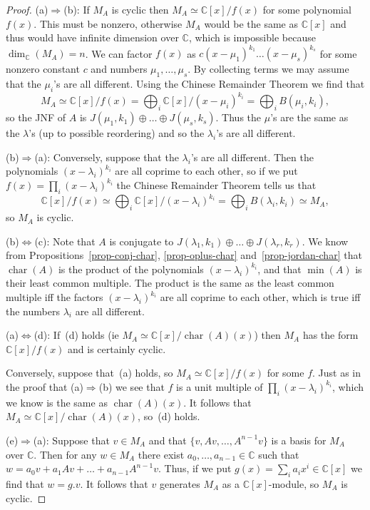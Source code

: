 \documentclass{amsart}
\newcommand{\chr}       {\operatorname{char}}
\newcommand{\C}         {{\mathbb{C}}}
\newcommand{\lm}        {\lambda}
\newcommand{\op}        {\oplus}
\newcommand{\iffa}      {\Leftrightarrow}
\renewcommand{\:}{\colon}
\theoremstyle{definition}
\begin{document}
\begin{proof}
 (a)$\Rightarrow$(b):
  If $M_A$ is cyclic then $M_A\simeq\C[x]/f(x)$ for some polynomial
  $f(x)$.  This must be nonzero, otherwise $M_A$ would be the same as
  $\C[x]$ and thus would have infinite dimension over $\C$, which is
  impossible because $\dim_\C(M_A)=n$.  We can factor $f(x)$ as
  $c(x-\mu_1)^{k_1}\ldots(x-\mu_s)^{k_s}$ for some nonzero constant
  $c$ and numbers $\mu_1,\ldots,\mu_s$.  By collecting terms we may
  assume that the $\mu_i$'s are all different.  Using the Chinese
  Remainder Theorem we find that 
  \[ M_A\simeq\C[x]/f(x)=\bigoplus_i\C[x]/(x-\mu_i)^{k_i}=
     \bigoplus_iB(\mu_i,k_i),
  \]
  so the JNF of $A$ is $J(\mu_1,k_1)\op\ldots\op J(\mu_s,k_s)$.  Thus
  the $\mu$'s are the same as the $\lm$'s (up to possible reordering)
  and so the $\lm_i$'s are all different.
 
 (b)$\Rightarrow$(a): Conversely, suppose that the $\lm_i$'s are all
  different.  Then the polynomials $(x-\lm_i)^{k_i}$ are all coprime to
  each other, so if we put $f(x)=\prod_i(x-\lm_i)^{k_i}$ the Chinese
  Remainder Theorem tells us that 
  \[ \C[x]/f(x) \simeq \bigoplus_i\C[x]/(x-\lm_i)^{k_i} = 
        \bigoplus_i B(\lm_i,k_i) \simeq M_A,
  \]
  so $M_A$ is cyclic.

 (b)$\iffa$(c): Note that $A$ is conjugate to
  $J(\lm_1,k_1)\op\ldots\op J(\lm_r,k_r)$.  We know from
  Propositions~\ref{prop-conj-char}, \ref{prop-oplus-char}
  and~\ref{prop-jordan-char} that $\chr(A)$ is 
  the product of the polynomials $(x-\lm_i)^{k_i}$, and that $\min(A)$
  is their least common multiple.  The product is the same as the
  least common multiple iff the factors $(x-\lm_i)^{k_i}$ are all
  coprime to each other, which is true iff the numbers $\lm_i$ are all
  different. 

 (a)$\iffa$(d): If~(d) holds (ie $M_A\simeq\C[x]/\chr(A)(x)$) then
  $M_A$ has the form $\C[x]/f(x)$ and is certainly cyclic.

  Conversely, suppose that~(a) holds, so $M_A\simeq\C[x]/f(x)$ for some
  $f$.  Just as in the proof that (a)$\Rightarrow$(b) we see that $f$
  is a unit multiple of $\prod_i(x-\lm_i)^{k_i}$, which we know is the
  same as $\chr(A)(x)$.  It follows that $M_A\simeq\C[x]/\chr(A)(x)$,
  so~(d) holds.

 (e)$\Rightarrow$(a): Suppose that $v\in M_A$ and that
  $\{v,Av,\ldots,A^{n-1}v\}$ is a basis for $M_A$ over $\C$.  Then for
  any $w\in M_A$ there exist $a_0,\ldots,a_{n-1}\in\C$ such that
  $w=a_0v+a_1Av+\ldots+a_{n-1}A^{n-1}v$.  Thus, if we put
  $g(x)=\sum_ia_ix^i\in\C[x]$ we find that $w=g.v$.  It follows that
  $v$ generates $M_A$ as a $\C[x]$-module, so $M_A$ is cyclic.


\end{proof}
\end{document}
